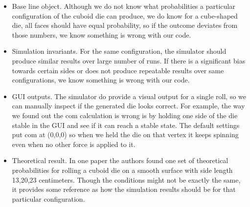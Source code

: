 \begin{itemize}
    \item Base line object. Although we do not know what probabilities a particular configuration of the cuboid die can produce, we do know for a cube-shaped die, all faces should have equal probability, so if the outcome deviates from those numbers, we know something is wrong with our code.\\
    \item Simulation invariants. For the same configuration, the simulator should produce similar results over large number of runs. If there is a significant bias towards certain sides or does not produce repeatable results over same configurations, we know something is wrong with our code.\\
    \item GUI outputs. The simulator do provide a visual output for a single roll, so we can manually inspect if the generated die looks correct. For example, the way we found out the com calculation is wrong is by holding one side of the die stable in the GUI and see if it can reach a stable state. The default settings put com at (0,0,0) so when we held the die on that vertex it keeps spinning even when no other force is applied to it.\\
    \item Theoretical result. In one paper\cite{Riemer2014} the authors found one set of theoretical probabilities for rolling a cuboid die on a smooth surface with side length 13,20,23 centimeters. Though the conditions might not be exactly the same, it provides some reference as how the simulation results should be for that particular configuration.
    
\end{itemize}

